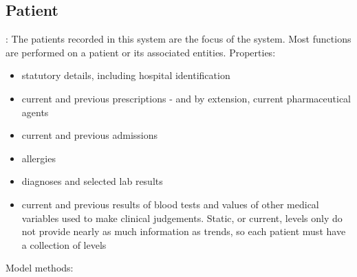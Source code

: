 \documentclass[letterpaper]{amsart}
\begin{document}
\paragraph{}
\subsection{Patient}:
The patients recorded in this system are the focus of the system.  Most functions are performed on a patient or its associated entities.
Properties:
\begin{itemize}
    \item statutory details, including hospital identification
    \item current and previous prescriptions - and by extension, current pharmaceutical agents
    \item current and previous admissions
    \item allergies
    \item diagnoses and selected lab results 
    \item current and previous results of blood tests and values of other medical variables used to make clinical judgements.  Static, or current, levels only do not provide nearly as much information as trends, so each patient must have a collection of levels
\end{itemize}
Model methods:
\end{document}
